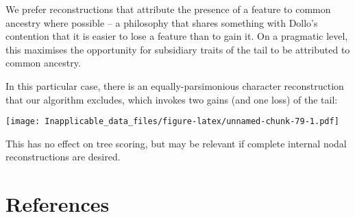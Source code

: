 \documentclass[]{book}
\theoremstyle{definition}
\theoremstyle{definition}
\theoremstyle{definition}
\theoremstyle{remark}
\begin{document}
We prefer reconstructions that attribute the presence of a feature to
common ancestry where possible -- a philosophy that shares something
with Dollo's contention that it is easier to lose a feature than to gain
it. On a pragmatic level, this maximises the opportunity for subsidiary
traits of the tail to be attributed to common ancestry.

In this particular case, there is an equally-parsimonious character
reconstruction that our algorithm excludes, which invokes two gains (and
one loss) of the tail:

\texttt{[image: Inapplicable\_data\_files/figure-latex/unnamed-chunk-79-1.pdf]}

This has no effect on tree scoring, but may be relevant if complete
internal nodal reconstructions are desired.

\hypertarget{references}{%
\chapter*{References}\label{references}}


\end{document}
